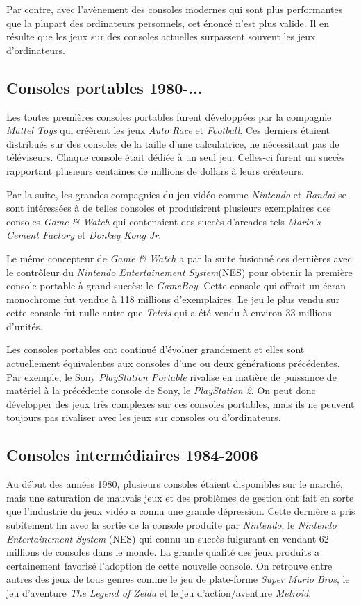 \documentclass[12pt,twoside,letterpaper,francais]{book}
\begin{document}
Par contre, avec l'avènement des consoles modernes qui sont plus
performantes que la plupart des ordinateurs personnels, cet énoncé
n'est plus valide. Il en résulte que les jeux sur des consoles
actuelles surpassent souvent les jeux d'ordinateurs.


\FloatBarrier
\subsection{Consoles portables 1980-...}
Les toutes premières consoles portables furent développées par la
compagnie \textit{Mattel Toys} qui créèrent les jeux \textit{Auto
  Race} et \textit{Football}. Ces derniers étaient distribués sur des
consoles de la taille d'une calculatrice, ne nécessitant pas de
téléviseurs. Chaque console était dédiée à un seul jeu. Celles-ci
furent un succès rapportant plusieurs centaines de millions de dollars
à leurs créateurs.

Par la suite, les grandes compagnies du jeu vidéo comme
\textit{Nintendo} et \textit{Bandai} se sont intéressées à de telles
consoles et produisirent plusieurs exemplaires des consoles
\textit{Game \& Watch} qui contenaient des succès d'arcades tels
\textit{Mario's Cement Factory} et \textit{Donkey Kong Jr}.

Le même concepteur de \textit{Game \& Watch} a par la suite fusionné
ces dernières avec le contrôleur du \textit{Nintendo Entertainement
  System}(NES) pour obtenir la première console portable à grand
succès: le \textit{GameBoy}. Cette console qui offrait un écran
monochrome fut vendue à 118 millions d'exemplaires. Le jeu le plus
vendu sur cette console fut nulle autre que \textit{Tetris} qui a été
vendu à environ 33 millions d'unités.

Les consoles portables ont continué d'évoluer grandement et elles
sont actuellement équivalentes aux consoles d'une ou deux générations
précédentes. Par exemple, le Sony \textit{PlayStation Portable}
rivalise en matière de puissance de matériel à la précédente console
de Sony, le \textit{PlayStation 2}. On peut donc développer des jeux
très complexes sur ces consoles portables, mais ils ne peuvent toujours
pas rivaliser avec les jeux sur consoles ou d'ordinateurs.


\FloatBarrier
\subsection{Consoles intermédiaires 1984-2006}
Au début des années 1980, plusieurs consoles étaient disponibles sur
le marché, mais une saturation de mauvais jeux et des problèmes de
gestion ont fait en sorte que l'industrie du jeux vidéo a connu une
grande dépression. Cette dernière a pris subitement fin avec la sortie
de la console produite par \textit{Nintendo}, le \textit{Nintendo
  Entertainement System} (NES) qui connu un succès fulgurant en
vendant 62 millions de consoles dans le monde. La grande qualité des
jeux produits a certainement favorisé l'adoption de cette nouvelle
console. On retrouve entre autres des jeux de tous genres comme le jeu
de plate-forme \textit{Super Mario Bros}, le jeu d'aventure
\textit{The Legend of Zelda} et le jeu d'action/aventure
\textit{Metroid}.
\end{document}
